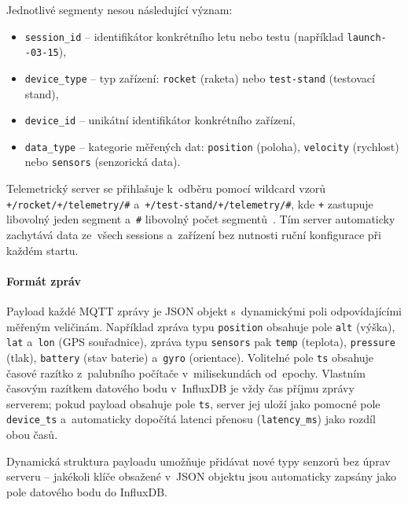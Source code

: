 \noindent Jednotlivé segmenty nesou následující význam:
\begin{sloppypar}
\begin{itemize}
    \item \texttt{session\_id} -- identifikátor konkrétního letu nebo testu (například \texttt{launch--03-15}),
    \item \texttt{device\_type} -- typ zařízení: \texttt{rocket} (raketa) nebo \texttt{test-stand} (testovací stand),
    \item \texttt{device\_id} -- unikátní identifikátor konkrétního zařízení,
    \item \texttt{data\_type} -- kategorie měřených dat: \texttt{position} (poloha), \texttt{velocity} (rychlost) nebo \texttt{sensors} (senzorická data).
\end{itemize}
\end{sloppypar}

\begin{sloppypar}
Telemetrický server se přihlašuje k~odběru pomocí wildcard vzorů \texttt{+/\allowbreak rocket/\allowbreak +/\allowbreak telemetry/\allowbreak \#} a~\texttt{+/\allowbreak test-stand/\allowbreak +/\allowbreak telemetry/\allowbreak \#}, kde \texttt{+} zastupuje libovolný jeden segment a~\texttt{\#} libovolný počet segmentů~\cite{mqtt2014oasis}. Tím server automaticky zachytává data ze~všech sessions a~zařízení bez nutnosti ruční konfigurace při každém startu.
\end{sloppypar}

\paragraph{Formát zpráv}

Payload každé MQTT zprávy je JSON objekt s~dynamickými poli odpovídajícími měřeným veličinám. Například zpráva typu \texttt{position} obsahuje pole \texttt{alt} (výška), \texttt{lat} a~\texttt{lon} (GPS souřadnice), zpráva typu \texttt{sensors} pak \texttt{temp} (teplota), \texttt{pressure} (tlak), \texttt{battery} (stav baterie) a~\texttt{gyro} (orientace). Volitelné pole \texttt{ts} obsahuje časové razítko z~palubního počítače v~milisekundách od~epochy. Vlastním časovým razítkem datového bodu v~InfluxDB je vždy čas příjmu zprávy serverem; pokud payload obsahuje pole \texttt{ts}, server jej uloží jako pomocné pole \texttt{device\_ts} a~automaticky dopočítá latenci přenosu (\texttt{latency\_ms}) jako rozdíl obou časů.

Dynamická struktura payloadu umožňuje přidávat nové typy senzorů bez úprav serveru -- jakékoli klíče obsažené v~JSON objektu jsou automaticky zapsány jako pole datového bodu do InfluxDB.

